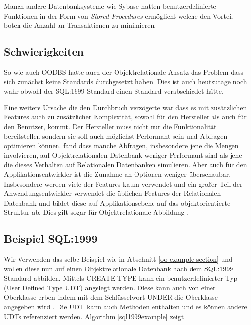 Manch andere Datenbanksysteme wie Sybase hatten benutzerdefinierte Funktionen in der Form von \emph{Stored Procedures} ermöglicht welche den Vorteil boten die Anzahl an Transaktionen zu minimieren.

\subsection{Schwierigkeiten}
So wie auch OODBS hatte auch der Objektrelationale Ansatz das Problem dass sich zunächst keine Standards durchgesetzt haben. Dies ist auch heutzutage noch wahr obwohl der SQL:1999 Standard einen Standard verabschiedet hätte.

Eine weitere Ursache die den Durchbruch verzögerte war dass es mit zusätzlichen Features auch zu zusätzlicher Komplexität, sowohl für den Hersteller als auch für den Benutzer, kommt. Der Hersteller muss nicht nur die Funktionalität bereitstellen sondern sie soll auch möglichst Performant sein und Abfragen optimieren können. \cite{carey1997} fand dass manche Abfragen, insbesondere jene die Mengen involvieren, auf Objektrelationalen Datenbank weniger Performant sind als jene die dieses Verhalten auf Relationalen Datenbanken simulieren.
Aber auch für den Applikationsentwickler ist die Zunahme an Optionen weniger überschaubar. Insbesondere werden viele der Features kaum verwendet und ein großer Teil der Anwendungsentwickler verwendet die üblichen Features der Relationalen Datenbank und bildet diese auf Applikationsebene auf das objektorientierte Struktur ab. Dies gilt sogar für Objektrelationale Abbildung \cite{fotache2009}.

\subsection{Beispiel SQL:1999}
Wir Verwenden das selbe Beispiel wie in Abschnitt \ref{oo-example-section} und wollen diese nun auf einen Objektrelationale Datenbank nach dem SQL:1999 Standard abbilden.  Mittels CREATE TYPE kann ein benutzerdefinierter Typ (User Defined Type UDT) angelegt werden. Diese kann auch von einer Oberklasse erben indem mit dem Schlüsselwort UNDER die Oberklasse angegeben wird \cite{gulutzan1999}. Die UDT kann auch Methoden enthalten und es können andere UDTs referenziert werden. Algorithm \ref{sql1999example} zeigt 

